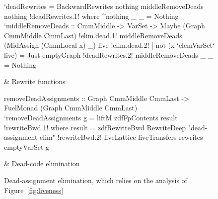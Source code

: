 \documentclass[blockstyle,preprint,natbib,nocopyrightspace]{sigplanconf}
\def\authornote#1{\unskip\relax}
\newcommand{\john}[1]{\authornote{JD: #1}}
\newcommand\figref[1]{Figure~\ref{fig:#1}}
\newcommand\figlabel[1]{\label{fig:#1}}
\begin{document}



\begin{figure*}
\begin{codetable}
\T
\begin{code}
`deadRewrites = BackwardRewrites nothing middleRemoveDeads nothing
!deadRewrites.1!  where ^nothing _ _ = Nothing
        `middleRemoveDeads :: CmmMiddle -> VarSet -> Maybe (Graph CmmMiddle CmmLast)
!elim.dead.1!        middleRemoveDeads (MidAssign (CmmLocal x) _) live
!elim.dead.2!            | not (x `elemVarSet` live) = Just emptyGraph
!deadRewrites.2!        middleRemoveDeads _ _ = Nothing
\end{code}
\B
& Rewrite \mbox{functions}\\
\hline

\T
\begin{code}
removeDeadAssignments :: Graph CmmMiddle CmmLast -> FuelMonad (Graph CmmMiddle CmmLast)
`removeDeadAssignments g = liftM zdfFpContents result
!rewriteBwd.1!     where result = zdfRewriteBwd RewriteDeep "dead-assignment elim"
!rewriteBwd.2!                                  liveLattice liveTransfers rewrites emptyVarSet g
\end{code}
& \vspace*{12pt}\mbox{Dead-code} elimination\\
\end{codetable}
\caption{Dead-assignment elimination, which relies on the analysis of
\figref{liveness}} 
\figlabel{dead-elim}
\end{figure*}
\end{document}
